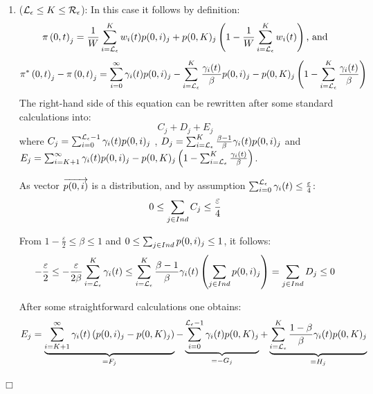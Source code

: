 \documentclass[a4paper,11pt]{article}
\newenvironment{proof}{\trivlist \item[\hskip \labelsep{\bf Proof}]}{\hfill\hbox{$\Box$}\endtrivlist}
\begin{document}
\begin{proof}
\begin{enumerate}
				\item ($\mathcal{L}_{\epsilon} \leq K \leq \mathcal{R}_{\epsilon}$): In this case it follows by definition:
					\begin{equation}
						\pi \left(0, t \right )_{j} = \frac{1}{W} \sum_{i=\mathcal{L}_{\epsilon}}^{K}w_{i}(t) p(0,i)_{j} + p(0,K)_{j} \left(1- \frac{1}{W} \sum_{i=\mathcal{L}_{\epsilon}}^{K}w_{i}(t) \right) \text{, and} \nonumber
					\end{equation}
					\begin{equation}
						\pi^{*} \left(0, t \right )_{j} - \pi \left(0, t \right )_{j} =\sum_{i=0}^{\infty} \gamma_{i}(t) p(0,i)_{j} - \sum_{i=\mathcal{L}_{\epsilon}}^{K}\frac{\gamma_{i}(t)}{\beta} p(0,i)_{j} - p(0,K)_{j} \left(1 - \sum_{i=\mathcal{L}_{\epsilon}}^{K}\frac{\gamma_{i}(t)}{\beta} \right) \nonumber
					\end{equation}
						The right-hand side of this equation can be rewritten after some standard calculations into:
					\begin{equation}
						C_{j} + D_{j} + E_{j} \nonumber
					\end{equation}
					where $C_{j} = \sum_{i=0}^{\mathcal{L}_{\epsilon}-1} \gamma_{i}(t) p(0,i)_{j}$ , $D_{j} = \sum_{i=\mathcal{L}_{\epsilon}}^{K} \frac{\beta - 1}{\beta} \gamma_{i}(t) p(0,i)_{j} $ and $E_{j} = \sum_{i=K+1}^{\infty}\gamma_{i}(t) p(0,i)_{j} - p(0,K)_{j} \left(1 -	\sum_{i=\mathcal{L}_{\epsilon}}^{K}\frac{\gamma_{i}(t)}{\beta} \right)$.
					
					As vector $\overrightarrow{p(0,i)}$ is a distribution, and by assumption $\sum_{i=0}^{\mathcal{L}_{\epsilon}}\gamma_{i}(t) \leq \frac{\varepsilon}{4}$:
					\begin{equation}
						 0 \leq \sum_{j \in Ind} C_{j} \leq \frac{\varepsilon}{4} \nonumber
					\end{equation}

					From $1- \frac{\varepsilon}{2} \leq \beta \leq 1$ and $0 \leq \sum_{j \in Ind} p(0,i)_{j} \leq 1$, it follows:
					\begin{equation}
						 - \frac{\varepsilon}{2} \leq - \frac{\varepsilon}{2 \beta} \sum_{i=\mathcal{L}_{\epsilon}}^{K} \gamma_{i}(t) \leq \sum_{i=\mathcal{L}_{\epsilon}}^{K} \frac{\beta - 1}{\beta} \gamma_{i}(t) \left( \sum_{j \in Ind} p(0,i)_{j} \right) = \sum_{j \in Ind} D_{j} \leq 0 \nonumber
					\end{equation}

					After some straightforward calculations one obtains:
					\begin{equation}
						E_{j} = \underbrace{\sum_{i=K+1}^{\infty}\gamma_{i}(t) \left( p(0,i)_{j} - p(0,K)_{j} \right)}_{ = F_{j}} - \underbrace{\sum_{i=0}^{\mathcal{L}_{\epsilon}-1}\gamma_{i}(t) p(0,K)_{j}}_{= -G_{j}} + \underbrace{\sum_{i=\mathcal{L}_{\epsilon}}^{K}\frac{1- \beta}{\beta} \gamma_{i}(t) p(0,K)_{j}}_{ = H_{j}} \nonumber
					\end{equation}


\end{enumerate}
\end{proof}
\end{document}
